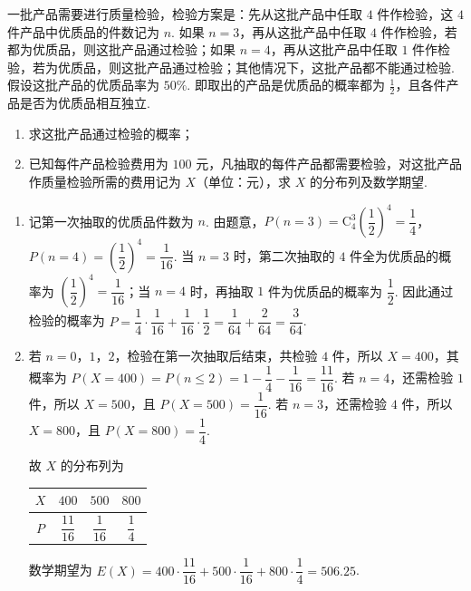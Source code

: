 \begin{problem}
一批产品需要进行质量检验，检验方案是：先从这批产品中任取 \(4\) 件作检验，这 \(4\) 件产品中优质品的件数记为 \(n\). 如果 \(n = 3\)，再从这批产品中任取 \(4\) 件作检验，若都为优质品，则这批产品通过检验；如果 \(n = 4\)，再从这批产品中任取 \(1\) 件作检验，若为优质品，则这批产品通过检验；其他情况下，这批产品都不能通过检验. 假设这批产品的优质品率为 \(50\%\). 即取出的产品是优质品的概率都为 \(\frac{1}{2}\)，且各件产品是否为优质品相互独立.
\begin{enumerate}
\item 求这批产品通过检验的概率；
\item 已知每件产品检验费用为 \(100\text{ 元}\)，凡抽取的每件产品都需要检验，对这批产品作质量检验所需的费用记为 \(X\)（单位：元），求 \(X\) 的分布列及数学期望.
\end{enumerate}
\end{problem}

\begin{solution}
\begin{enumerate}
\item 记第一次抽取的优质品件数为 \(n\). 由题意，\(P(n=3)=\mathrm C_4^3\left(\dfrac12\right)^4=\dfrac14\)，\(P(n=4)=\left(\dfrac12\right)^4=\dfrac1{16}\). 当 \(n=3\) 时，第二次抽取的 \(4\) 件全为优质品的概率为 \(\left(\dfrac12\right)^4=\dfrac1{16}\)；当 \(n=4\) 时，再抽取 \(1\) 件为优质品的概率为 \(\dfrac12\). 因此通过检验的概率为
\(P=\dfrac14\cdot\dfrac1{16}+\dfrac1{16}\cdot\dfrac12=\dfrac1{64}+\dfrac2{64}=\dfrac3{64}\).

\item 若 \(n=0\)，\(1\)，\(2\)，检验在第一次抽取后结束，共检验 \(4\) 件，所以 \(X=400\)，其概率为
\(P(X=400)=P(n\leqslant2)=1-\dfrac14-\dfrac1{16}=\dfrac{11}{16}\). 若 \(n=4\)，还需检验 \(1\) 件，所以 \(X=500\)，且 \(P(X=500)=\dfrac1{16}\). 若 \(n=3\)，还需检验 \(4\) 件，所以 \(X=800\)，且 \(P(X=800)=\dfrac14\).

故 \(X\) 的分布列为
\begin{center}
\begin{tabular}{c|ccc}
\(X\) & \(400\) & \(500\) & \(800\) \\
\hline
\(P\) & \(\dfrac{11}{16}\) & \(\dfrac1{16}\) & \(\dfrac14\)
\end{tabular}
\end{center}

数学期望为 \(E(X)=400\cdot\dfrac{11}{16}+500\cdot\dfrac1{16}+800\cdot\dfrac14=506.25\).
\end{enumerate}
\end{solution}


